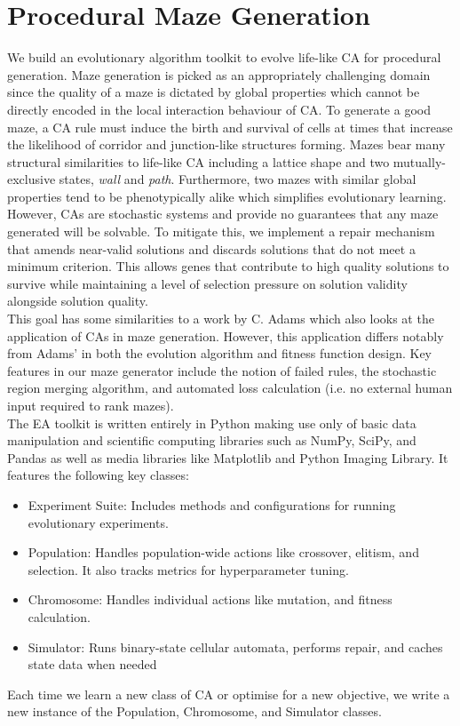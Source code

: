 \chapter{Procedural Maze Generation} \label{procedural}

We build an evolutionary algorithm toolkit to evolve life-like CA for procedural generation. Maze generation is picked as an appropriately challenging domain since the quality of a maze is dictated by global properties which cannot be directly encoded in the local interaction behaviour of CA. To generate a good maze, a CA rule must induce the birth and survival of cells at times that increase the likelihood of corridor and junction-like structures forming. Mazes bear many structural similarities to life-like CA including a lattice shape and two mutually-exclusive states, \textit{wall} and \textit{path}. Furthermore, two mazes with similar global properties tend to be phenotypically alike which simplifies evolutionary learning. However, CAs are stochastic systems and provide no guarantees that any maze generated will be solvable. To mitigate this, we implement a repair mechanism that amends near-valid solutions and discards solutions that do not meet a minimum criterion. This allows genes that contribute to high quality solutions to survive while maintaining a level of selection pressure on solution validity alongside solution quality.\\

This goal has some similarities to a work by C. Adams\cite{adams2018evolving} which also looks at the application of CAs in maze generation. However, this application differs notably from Adams' in both the evolution algorithm and fitness function design. Key features in our maze generator include the notion of failed rules, the stochastic region merging algorithm, and automated loss calculation (i.e. no external human input required to rank mazes).\\

The EA toolkit is written entirely in Python making use only of basic data manipulation and scientific computing libraries such as NumPy, SciPy, and Pandas as well as media libraries like Matplotlib and Python Imaging Library. It features the following key classes:
\begin{itemize}
    \item Experiment Suite: Includes methods and configurations for running evolutionary experiments.
    \item Population: Handles population-wide actions like crossover, elitism, and selection. It also tracks metrics for hyperparameter tuning.
    \item Chromosome: Handles individual actions like mutation, and fitness calculation.
    \item Simulator: Runs binary-state cellular automata, performs repair, and caches state data when needed
\end{itemize}
Each time we learn a new class of CA or optimise for a new objective, we write a new instance of the Population,  Chromosome, and Simulator classes.

